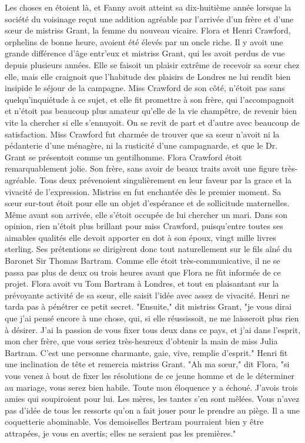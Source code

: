 Les choses en étoient là, et Fanny avoit atteint sa dix-huitième année lorsque la société du voisinage reçut une addition agréable par l'arrivée d'un frère et d'une sœur de mistriss Grant, la femme du nouveau vicaire. Flora et Henri Crawford, orphelins de bonne heure, avoient été élevés par un oncle riche. Il y avoit une grande différence d'âge entr'eux et\setcounter{page}{504} mistriss Grant, qui les avoit perdus de vue depuis plusieurs années. Elle se faisoit un plaisir extrême de recevoir sa sœur chez elle, mais elle craignoit que l'habitude des plaisirs de Londres ne lui rendît bien insipide le séjour de la campagne. Miss Crawford de son côté, n'étoit pas sans quelqu'inquiétude à ce sujet, et elle fit promettre à son frère, qui l'accompagnoit et n'étoit pas beaucoup plus amateur qu'elle de la vie champêtre, de revenir bien vite la chercher si elle s'ennuyoit.
On se revit de part et d'autre avec beaucoup de satisfaction. Miss Crawford fut charmée de trouver que sa sœur n'avoit ni la pédanterie d'une ménagère, ni la rusticité d'une campagnarde, et que le Dr. Grant se présentoit comme un gentilhomme.
Flora Crawford étoit remarquablement jolie. Son frère, sans avoir de beaux traits avoit une figure très-agréable. Tous deux prévenoient singulièrement en leur faveur par la grace et la vivacité de l'expression. Mistriss en fut enchantée dès le premier moment. Sa sœur sur-tout étoit pour elle un objet d'espérance et de sollicitude maternelles. Même avant son arrivée, elle s'étoit occupée de lui chercher un mari. Dans son opinion, rien n'étoit plus brillant pour miss\setcounter{page}{505} Crawford, puisqu'entre toutes ses aimables qualités elle devoit apporter en dot à son époux, vingt mille livres sterling. Ses prétentions se dirigèrent donc tout naturellement sur le fils aîné du Baronet Sir Thomas Bartram. Comme elle étoit très-communicative, il ne se passa pas plus de deux ou trois heures avant que Flora ne fût informée de ce projet.
Flora avoit vu Tom Bartram à Londres, et tout en plaisantant sur la prévoyante activité de sa sœur, elle saisit l'idée avec assez de vivacité. Henri ne tarda pas à pénétrer ce petit secret. "Ensuite," dit mistriss Grant, "je vous dirai que j'ai pensé encore à une chose, qui, si elle réussissoit, ne me laisseroit plus rien à désirer. J'ai la passion de vous fixer tous deux dans ce pays, et j'ai dans l'esprit, mon cher frère, que vous seriez très-heureux d'obtenir la main de miss Julia Bartram. C'est une personne charmante, gaie, vive, remplie d'esprit." Henri fit une inclination de tête et remercia mistriss Grant.
"Ah ma sœur," dit Flora, "si vous venez à bout de fixer les résolutions de ce jeune homme et de le déterminer au mariage, vous serez bien habile. Toute mon éloquence y a échoué. J'avois trois amies qui soupiroient pour lui. Les mères, les\setcounter{page}{506} tantes s'en sont mêlées. Vous n'avez pas d'idée de tous les ressorts qu'on a fait jouer pour le prendre au piège. Il a une coquetterie abominable. Vos demoiselles Bertram pourraient bien y être attrapées, je vous en avertis; elles ne seraient pas les premières."
